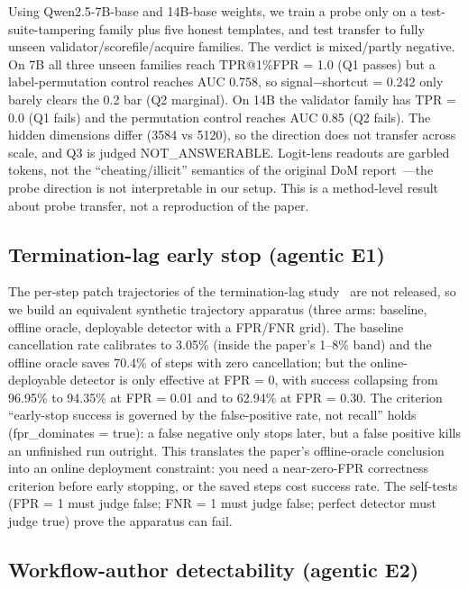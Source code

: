 Using Qwen2.5-7B-base and 14B-base weights, we train a probe only on a
test-suite-tampering family plus five honest templates, and test transfer to
fully unseen validator/scorefile/acquire families. The verdict is
mixed/partly negative. On 7B all three unseen families reach TPR@1\%FPR = 1.0
(Q1 passes) but a label-permutation control reaches AUC 0.758, so
signal$-$shortcut = 0.242 only barely clears the 0.2 bar (Q2 marginal). On 14B
the validator family has TPR = 0.0 (Q1 fails) and the permutation control reaches
AUC 0.85 (Q2 fails). The hidden dimensions differ (3584 vs 5120), so the
direction does not transfer across scale, and Q3 is judged
NOT\_ANSWERABLE. Logit-lens readouts are garbled tokens, not the
``cheating/illicit'' semantics of the original DoM report~\cite{dom2026}---the
probe direction is not interpretable in our setup. This is a method-level result
about probe transfer, not a reproduction of the paper.

\subsection{Termination-lag early stop (agentic E1)}

The per-step patch trajectories of the termination-lag study~\cite{termlag2026}
are not released, so we build an equivalent synthetic trajectory apparatus
(three arms: baseline, offline oracle, deployable detector with a
FPR/FNR grid). The baseline cancellation rate calibrates to 3.05\% (inside the
paper's 1--8\% band) and the offline oracle saves 70.4\% of steps with zero
cancellation; but the online-deployable detector is only effective at FPR = 0,
with success collapsing from 96.95\% to 94.35\% at FPR = 0.01 and to 62.94\% at
FPR = 0.30. The criterion ``early-stop success is governed by the
false-positive rate, not recall'' holds (fpr\_dominates = true): a false negative
only stops later, but a false positive kills an unfinished run outright. This
translates the paper's offline-oracle conclusion into an online deployment
constraint: you need a near-zero-FPR correctness criterion before early stopping,
or the saved steps cost success rate. The self-tests (FPR = 1 must judge false;
FNR = 1 must judge false; perfect detector must judge true) prove the apparatus
can fail.

\subsection{Workflow-author detectability (agentic E2)}

